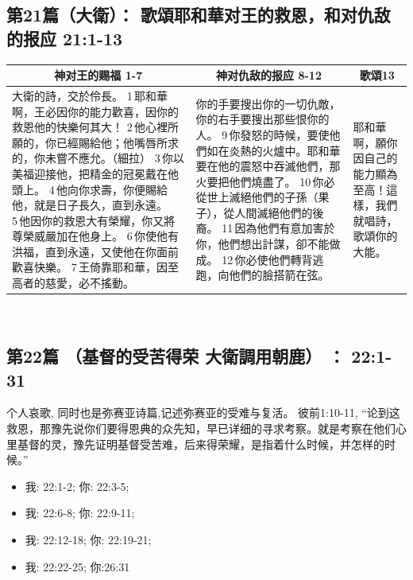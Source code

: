 \subsection{第21篇（大衛）： 歌頌耶和華对王的救恩，和对仇敌的报应 21:1-13}
\begin{table}[H]
\centering
\begin{tabular}{p{8.25cm}|p{6.75cm}|p{}}\hline\hline
\multicolumn{1}{c|}{神对王的赐福 1-7}&\multicolumn{1}{c}{神对仇敌的报应 8-12}&\multicolumn{1}{c}{歌頌13}\\\hline
大衛的詩，交於伶長。
1 耶和華啊，王必因你的能力歡喜，因你的救恩他的快樂何其大！
2 他心裡所願的，你已經賜給他；他嘴唇所求的，你未嘗不應允。（細拉）
3 你以美福迎接他，把精金的冠冕戴在他頭上。
4 他向你求壽，你便賜給他，就是日子長久，直到永遠。
5 他因你的救恩大有榮耀，你又將尊榮威嚴加在他身上。
6 你使他有洪福，直到永遠，又使他在你面前歡喜快樂。
7 王倚靠耶和華，因至高者的慈愛，必不搖動。
&你的手要搜出你的一切仇敵，你的右手要搜出那些恨你的人。
9 你發怒的時候，要使他們如在炎熱的火爐中。耶和華要在他的震怒中吞滅他們，那火要把他們燒盡了。
10 你必從世上滅絕他們的子孫（果子），從人間滅絕他們的後裔。
11 因為他們有意加害於你，他們想出計謀，卻不能做成。
12 你必使他們轉背逃跑，向他們的臉搭箭在弦。
&耶和華啊，願你因自己的能力顯為至高！這樣，我們就唱詩，歌頌你的大能。\\\hline
\end{tabular}
\end{table} 




\subsection{第22篇  （基督的受苦得荣 大衛調用朝鹿） ：  22:1-31}
个人哀歌, 同时也是弥赛亚诗篇,记述弥赛亚的受难与复活。 彼前1:10-11, “论到这救恩，那豫先说你们要得恩典的众先知，早已详细的寻求考察。就是考察在他们心里基督的灵，豫先证明基督受苦难，后来得荣耀，是指着什么时候，并怎样的时候。”
\begin{itemize}
\itemsep-.45em  
\item 我: 22:1-2;   你: 22:3-5;         
\item 我: 22:6-8;   你: 22:9-11;
\item 我: 22:12-18; 你: 22:19-21;
\item 我: 22:22-25; 你:26:31
\end{itemize}

